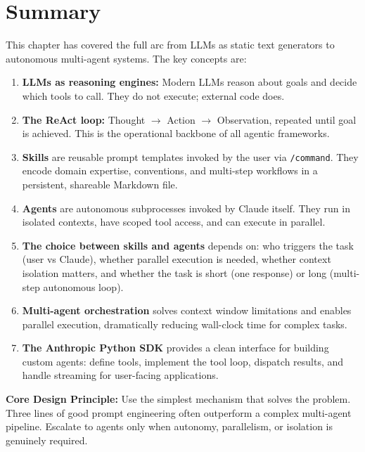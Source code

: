\documentclass[11pt,letterpaper]{article}
\begin{document}
\section{Summary}

This chapter has covered the full arc from LLMs as static text generators to autonomous multi-agent systems. The key concepts are:

\begin{enumerate}[leftmargin=*]
    \item \textbf{LLMs as reasoning engines:} Modern LLMs reason about goals and decide which tools to call. They do not execute; external code does.
    \item \textbf{The ReAct loop:} Thought $\rightarrow$ Action $\rightarrow$ Observation, repeated until goal is achieved. This is the operational backbone of all agentic frameworks.
    \item \textbf{Skills} are reusable prompt templates invoked by the user via \texttt{/command}. They encode domain expertise, conventions, and multi-step workflows in a persistent, shareable Markdown file.
    \item \textbf{Agents} are autonomous subprocesses invoked by Claude itself. They run in isolated contexts, have scoped tool access, and can execute in parallel.
    \item \textbf{The choice between skills and agents} depends on: who triggers the task (user vs Claude), whether parallel execution is needed, whether context isolation matters, and whether the task is short (one response) or long (multi-step autonomous loop).
    \item \textbf{Multi-agent orchestration} solves context window limitations and enables parallel execution, dramatically reducing wall-clock time for complex tasks.
    \item \textbf{The Anthropic Python SDK} provides a clean interface for building custom agents: define tools, implement the tool loop, dispatch results, and handle streaming for user-facing applications.
\end{enumerate}

\begin{notebox}
\textbf{Core Design Principle:} Use the simplest mechanism that solves the problem. Three lines of good prompt engineering often outperform a complex multi-agent pipeline. Escalate to agents only when autonomy, parallelism, or isolation is genuinely required.
\end{notebox}
\end{document}

